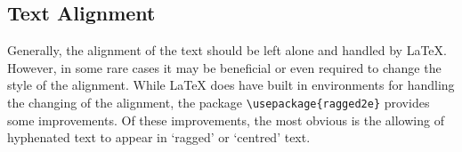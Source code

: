 		\subsection{Text Alignment}
			Generally, the alignment of the text should be left alone and handled by \LaTeX{}.
			However, in some rare cases it may  be beneficial or even required to change the style of the alignment.
			While \LaTeX{} does have built in environments for handling the changing of the alignment, the package \lstinline|\usepackage{ragged2e}| provides some improvements.
			Of these improvements, the most obvious is the allowing of hyphenated text to appear in `ragged' or `centred' text.
			\begin{flushleft}\exampleText\end{flushleft}
			
			\begin{FlushLeft}\exampleText\end{FlushLeft}
			
			\raggedright\exampleText
			
			\RaggedRight\exampleText
			
			\begin{flushright}\exampleText\end{flushright}
			
			\begin{FlushRight}\exampleText\end{FlushRight}
			
			\raggedleft\exampleText
			
			\RaggedLeft\exampleText
			
			\begin{center}\exampleText\end{center}
			
			\begin{Center}\exampleText\end{Center}
			
			\centering\exampleText
			
			\Centering\exampleText
			
			\justifying 
			
